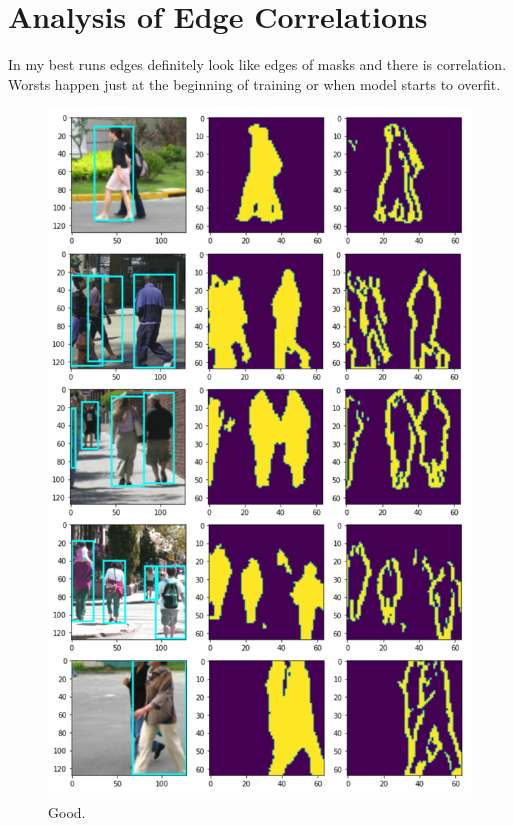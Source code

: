 \documentclass[a4paper]{article}
\begin{document}
\section{Analysis of Edge Correlations}
In my best runs edges definitely look like edges of masks and there is correlation.
Worsts happen just at the beginning of training or when model starts to overfit.
\begin{figure}[h]
    \centering
    \begin{minipage}[b]{0.45\textwidth}
        \includegraphics[width=\textwidth]{imgs/best.png}
        \caption{Good.}
    \end{minipage}
    \hfill
    \begin{minipage}[b]{0.45\textwidth}

\end{minipage}
\end{figure}
\end{document}
